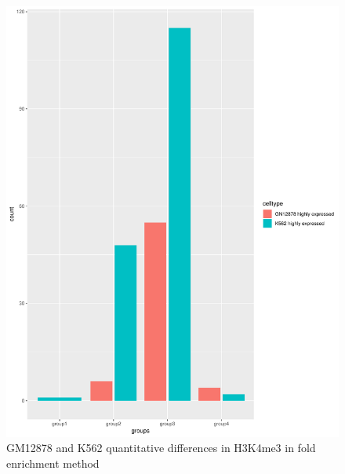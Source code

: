 \documentclass[11pt,letterpaper]{article}
\begin{document}
\begin{figure}[H]
	\begin{center}
		\includegraphics[scale=.3]{FE-H3K4me3-GM12878-K562.PDF}
		\vspace*{8pt}
		\caption{GM12878 and K562 quantitative differences in H3K4me3 in fold enrichment method}
		\label{fig:go2}
		
	\end{center}
\end{figure}
\end{document}
